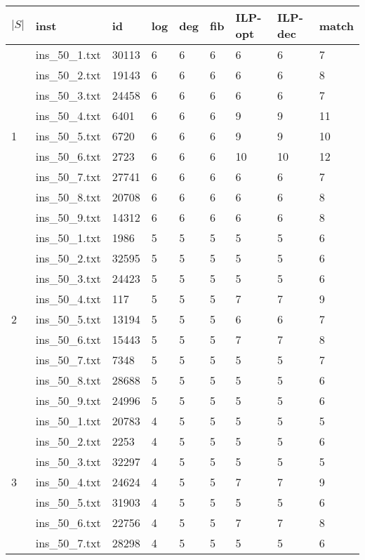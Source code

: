 \begin{table}[]
\begin{tabular}{lllllllll}
 $|S|$ & inst & id & log & deg & fib & ILP-opt & ILP-dec & match \\\hline
\multirow{9}{*}{1}
& ins\_50\_1.txt & 30113 & 6 & 6 & 6 & 6  & 6   & 7 \\
& ins\_50\_2.txt & 19143 & 6 & 6 & 6 & 6  & 6   & 8 \\
& ins\_50\_3.txt & 24458 & 6 & 6 & 6 & 6  & 6   & 7 \\
& ins\_50\_4.txt & 6401  & 6 & 6 & 6 & 9  & 9   & 11 \\
& ins\_50\_5.txt & 6720  & 6 & 6 & 6 & 9  & 9   & 10 \\
& ins\_50\_6.txt & 2723  & 6 & 6 & 6 & 10 & 10  & 12 \\
& ins\_50\_7.txt & 27741 & 6 & 6 & 6 & 6  & 6   & 7 \\
& ins\_50\_8.txt & 20708 & 6 & 6 & 6 & 6  & 6   & 8 \\
& ins\_50\_9.txt & 14312 & 6 & 6 & 6 & 6  & 6   & 8 \\
\hline 
\multirow{9}{*}{2}
& ins\_50\_1.txt & 1986  & 5 & 5 & 5 & 5  & 5   & 6 \\
& ins\_50\_2.txt & 32595 & 5 & 5 & 5 & 5  & 5   & 6 \\
& ins\_50\_3.txt & 24423 & 5 & 5 & 5 & 5  & 5   & 6 \\
& ins\_50\_4.txt & 117   & 5 & 5 & 5 & 7  & 7   & 9 \\
& ins\_50\_5.txt & 13194 & 5 & 5 & 5 & 6  & 6   & 7 \\
& ins\_50\_6.txt & 15443 & 5 & 5 & 5 & 7  & 7   & 8 \\
& ins\_50\_7.txt & 7348  & 5 & 5 & 5 & 5  & 5   & 7 \\
& ins\_50\_8.txt & 28688 & 5 & 5 & 5 & 5  & 5   & 6 \\
& ins\_50\_9.txt & 24996 & 5 & 5 & 5 & 5  & 5   & 6 \\
\hline 
\multirow{9}{*}{3}
& ins\_50\_1.txt & 20783 & 4 & 5 & 5 & 5  & 5   & 5 \\
& ins\_50\_2.txt & 2253  & 4 & 5 & 5 & 5  & 5   & 6 \\
& ins\_50\_3.txt & 32297 & 4 & 5 & 5 & 5  & 5   & 5 \\
& ins\_50\_4.txt & 24624 & 4 & 5 & 5 & 7  & 7   & 9 \\
& ins\_50\_5.txt & 31903 & 4 & 5 & 5 & 5  & 5   & 6 \\
& ins\_50\_6.txt & 22756 & 4 & 5 & 5 & 7  & 7   & 8 \\
& ins\_50\_7.txt & 28298 & 4 & 5 & 5 & 5  & 5   & 6 \\

\end{tabular}
\end{table}
